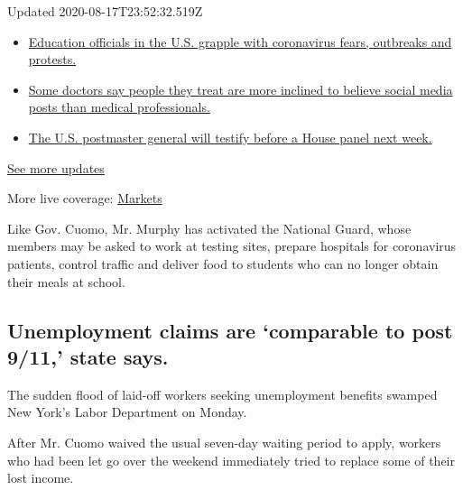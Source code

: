 Updated 2020-08-17T23:52:32.519Z

\begin{itemize}
\tightlist
\item
  \href{https://www.nytimes.com/2020/08/17/world/coronavirus-covid.html?action=click\&pgtype=Article\&state=default\&region=MAIN_CONTENT_1\&context=storylines_live_updates\#link-6cb7525}{Education
  officials in the U.S. grapple with coronavirus fears, outbreaks and
  protests.}
\item
  \href{https://www.nytimes.com/2020/08/17/world/coronavirus-covid.html?action=click\&pgtype=Article\&state=default\&region=MAIN_CONTENT_1\&context=storylines_live_updates\#link-23d8429b}{Some
  doctors say people they treat are more inclined to believe social
  media posts than medical professionals.}
\item
  \href{https://www.nytimes.com/2020/08/17/world/coronavirus-covid.html?action=click\&pgtype=Article\&state=default\&region=MAIN_CONTENT_1\&context=storylines_live_updates\#link-21a159a0}{The
  U.S. postmaster general will testify before a House panel next week.}
\end{itemize}

\href{https://www.nytimes.com/2020/08/17/world/coronavirus-covid.html?action=click\&pgtype=Article\&state=default\&region=MAIN_CONTENT_1\&context=storylines_live_updates}{See
more updates}

More live coverage:
\href{https://www.nytimes.com/live/2020/08/17/business/stock-market-today-coronavirus?action=click\&pgtype=Article\&state=default\&region=MAIN_CONTENT_1\&context=storylines_live_updates}{Markets}

Like Gov. Cuomo, Mr. Murphy has activated the National Guard, whose
members may be asked to work at testing sites, prepare hospitals for
coronavirus patients, control traffic and deliver food to students who
can no longer obtain their meals at school.

\hypertarget{unemployment-claims-are-comparable-to-post-911-state-says}{%
\subsection{Unemployment claims are `comparable to post 9/11,' state
says.}\label{unemployment-claims-are-comparable-to-post-911-state-says}}

The sudden flood of laid-off workers seeking unemployment benefits
swamped New York's Labor Department on Monday.

After Mr. Cuomo waived the usual seven-day waiting period to apply,
workers who had been let go over the weekend immediately tried to
replace some of their lost income.

